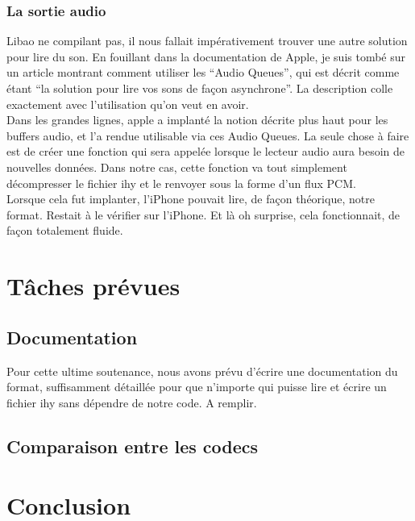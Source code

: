 \documentclass[a4paper,12pt]{article}
\begin{document}
		\subsubsection{La sortie audio}
Libao ne compilant pas, il nous fallait impérativement trouver une autre
solution pour lire du son. En fouillant dans la documentation de Apple, je suis
tombé sur un article montrant comment utiliser les ``Audio Queues'', qui est
décrit comme étant ``la solution pour lire vos sons de façon asynchrone''. La
description colle exactement avec l'utilisation qu'on veut en avoir.\\
Dans les grandes lignes, apple a implanté la notion décrite plus haut pour
les buffers audio, et l'a rendue utilisable via ces Audio Queues. La seule chose
à faire est de créer une fonction qui sera appelée lorsque le lecteur audio aura
besoin de nouvelles données. Dans notre cas, cette fonction va tout simplement
décompresser le fichier ihy et le renvoyer sous la forme d'un flux PCM.\\
Lorsque cela fut implanter, l'iPhone pouvait lire, de façon théorique, notre
format. Restait à le vérifier sur l'iPhone. Et là oh surprise, cela
fonctionnait, de façon totalement fluide. 

\newpage

\section{Tâches prévues}
	\subsection{Documentation}
Pour cette ultime soutenance, nous avons prévu d'écrire une documentation du
format, suffisamment détaillée pour que n'importe qui puisse lire et écrire un
fichier ihy sans dépendre de notre code. A remplir.
	\subsection{Comparaison entre les codecs}

\newpage

\section*{Conclusion}
\end{document}
